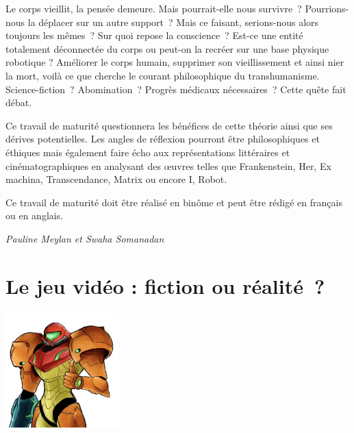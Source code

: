 \documentclass[
  10pt,
  french,
  a5paper,
  openany]{book}
\newenvironment{signature}{\begin{flushright}}{\end{flushright}}
\begin{document}

Le corps vieillit, la pensée demeure. Mais pourrait-elle nous survivre~? Pourrions-nous la déplacer sur un autre support~? Mais ce faisant, serions-nous alors toujours les mêmes~? Sur quoi repose la conscience~? Est-ce une entité totalement déconnectée du corps ou peut-on la recréer sur une base physique robotique ?
Améliorer le corps humain, supprimer son vieillissement et ainsi nier la mort, voilà ce que cherche le courant philosophique du transhumanisme. Science-fiction~? Abomination~? Progrès médicaux nécessaires~? Cette quête fait débat.

Ce travail de maturité questionnera les bénéfices de cette théorie ainsi que ses dérives potentielles. Les angles de réflexion pourront être philosophiques et éthiques mais également faire écho aux représentations littéraires et cinématographiques en analysant des œuvres telles que Frankenstein, Her, Ex machina, Transcendance, Matrix ou encore I, Robot.

\clearpage

Ce travail de maturité doit être réalisé en binôme et peut être rédigé en français ou en anglais.

\begin{signature}
\emph{Pauline Meylan et Swaha Somanadan}

\end{signature}

\hypertarget{le-jeu-viduxe9o-fiction-ou-ruxe9alituxe9}{%
\chapter{Le jeu vidéo : fiction ou réalité~?}\label{le-jeu-viduxe9o-fiction-ou-ruxe9alituxe9}}


\begin{center}
\includegraphics[width=\textwidth,height=12em]{images/le-jeu-video-fiction-ou-realite.jpg}

\end{center}
\end{document}
